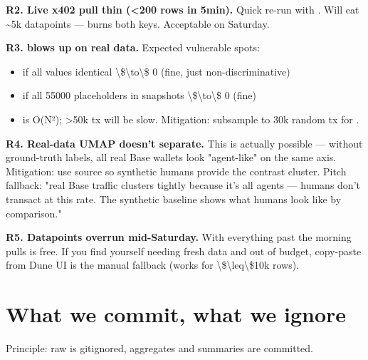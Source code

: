 \documentclass[11pt]{article}
\begin{document}
\textbf{R2. Live x402 pull thin (<200 rows in 5min).} Quick re-run with . Will eat \textasciitilde{}5k datapoints --- burns both keys. Acceptable on Saturday.

\textbf{R3.  blows up on real data.} Expected vulnerable spots:

\begin{itemize}
  \item {} if all values identical \textbackslash{}\$\textbackslash{}to\textbackslash{}\$ 0 (fine, just non-discriminative)
  \item {} if  all 55000 placeholders in snapshots \textbackslash{}\$\textbackslash{}to\textbackslash{}\$ 0 (fine)
  \item {} is O(N²); >50k tx will be slow. Mitigation: subsample to 30k random tx for .
\end{itemize}
\textbf{R4. Real-data UMAP doesn't separate.} This is actually possible --- without ground-truth  labels, all real Base wallets look "agent-like" on the same axis. Mitigation: use  source so synthetic humans provide the contrast cluster. Pitch fallback: "real Base traffic clusters tightly because it's all agents --- humans don't transact at this rate. The synthetic baseline shows what humans look like by comparison."

\textbf{R5. Datapoints overrun mid-Saturday.} With  everything past the morning pulls is free. If you find yourself needing fresh data and out of budget, copy-paste from Dune UI is the manual fallback (works for \textbackslash{}\$\textbackslash{}leq\textbackslash{}\$10k rows).

\section{What we commit, what we ignore}
Principle: raw is gitignored, aggregates and summaries are committed.
\end{document}
